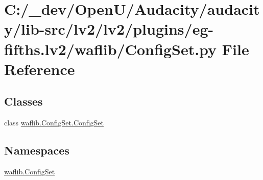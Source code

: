 \hypertarget{lv2_2plugins_2eg-fifths_8lv2_2waflib_2_config_set_8py}{}\section{C\+:/\+\_\+dev/\+Open\+U/\+Audacity/audacity/lib-\/src/lv2/lv2/plugins/eg-\/fifths.lv2/waflib/\+Config\+Set.py File Reference}
\label{lv2_2plugins_2eg-fifths_8lv2_2waflib_2_config_set_8py}
\subsection*{Classes}
\begin{DoxyCompactItemize}
\item 
class \hyperlink{classwaflib_1_1_config_set_1_1_config_set}{waflib.\+Config\+Set.\+Config\+Set}
\end{DoxyCompactItemize}
\subsection*{Namespaces}
\begin{DoxyCompactItemize}
\item 
 \hyperlink{namespacewaflib_1_1_config_set}{waflib.\+Config\+Set}
\end{DoxyCompactItemize}
